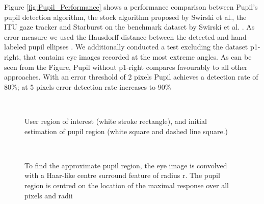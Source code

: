 \documentclass[12pt,fleqn]{book} %
\begin{document}
Figure \ref{fig:Pupil_Performance} shows a performance comparison between Pupil’s pupil detection algorithm, the stock algorithm proposed by Swirski et al., the ITU gaze tracker and Starburst on the benchmark dataset by Swirski et al. \cite{swirski}. As error measure we used the Hausdorff distance between the detected and hand-labeled pupil ellipses \cite{swirski}. We additionally conducted a test excluding the dataset p1-right, that contains eye images recorded at the most extreme angles.
As can be seen from the Figure, Pupil without p1-right compares favourably to all other approaches. With an error threshold of 2 pixels Pupil achieves a detection rate of 80\%; at 5 pixels error detection rate increases to 90\%

\begin{figure}[]
\begin{dBox}
\centering
  \mbox{
   }
   \caption{ User region of interest (white stroke rectangle), and initial estimation of pupil region (white square and dashed line square.)
 \label{fig:Pupil Region} }   
\end{dBox}   
\end{figure}


\begin{figure}[]
\begin{dBox}
\centering
  \mbox{
   }
   \caption{ To find the approximate pupil region, the eye image is convolved with a Haar-like centre surround feature of radius r. The pupil region is centred on the location of the maximal response over all pixels and radii
 \label{fig:EstimationPupilFig} }   
\end{dBox}   
\end{figure}
\end{document}
